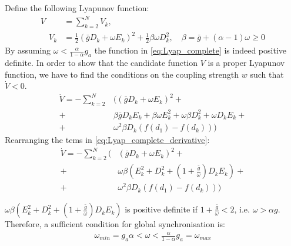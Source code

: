 Define the following Lyapunov function:
\begin{equation}
\begin{aligned}
V &= \sum\limits_{k=2}^N V_k, \\
\quad V_k &= \frac{1}{2}(\bar g D_k + \omega E_k)^2 + \frac{1}{2}\beta\omega D_k^2, \quad \beta = \bar g + (\alpha - 1)\omega \geq 0
\end{aligned}
\label{eq:Lyap_complete}
\end{equation}
By assuming $\omega< \frac{\alpha}{1-\alpha}g_a$ the function in \cref{eq:Lyap_complete} is indeed positive definite. In order to show that the candidate function $V$ is a proper Lyapunov function,  we have to find the conditions on the coupling strength $w$ such that $\dot V<0$. 
\begin{equation} 
\begin{aligned}
\dot V =  - \sum\limits_{k=2}^N & ((\bar gD_k + \omega E_k)^2 + \\
+ &\beta \bar g D_k E_k + \beta \omega E_k^2 + \omega \beta D_k^2 + \omega D_k E_k +\\
+ &\omega ^2 \beta D_k (f(d_1) - f(d_k)))
\end{aligned}
\label{eq:Lyap_complete_derivative}
\end{equation}
Rearranging the tems in \eqref{eq:Lyap_complete_derivative}:
\begin{equation} 
\begin{aligned}
\dot V =  - \sum\limits_{k=2}^N(& (\bar gD_k + \omega E_k)^2 + \\
+ &\omega \beta \left (E_k^2 + D_k^2 + \left(1 + \frac{\bar g}{\omega}\right) D_k E_k\right )  +\\
+ &\omega ^2 \beta D_k (f(d_1) - f(d_k)))
\end{aligned}
\label{eq:Lyap_complete_derivative_rearranged}
\end{equation}

$\omega \beta \left (E_k^2 + D_k^2 + \left(1 + \frac{\bar g}{\omega}\right) D_k E_k\right )$ is positive definite if $1 + \frac{\bar g}{\omega} <2$, i.e. $\omega > \alpha g$. Therefore, a sufficient condition for global synchronisation is:
\begin{equation} 
\begin{aligned}
\omega_{min} = g_a \alpha < \omega < \frac{\alpha}{1 - \alpha}g_a = \omega_{max}
\end{aligned}
\label{eq:omega_bounds}
\end{equation}

